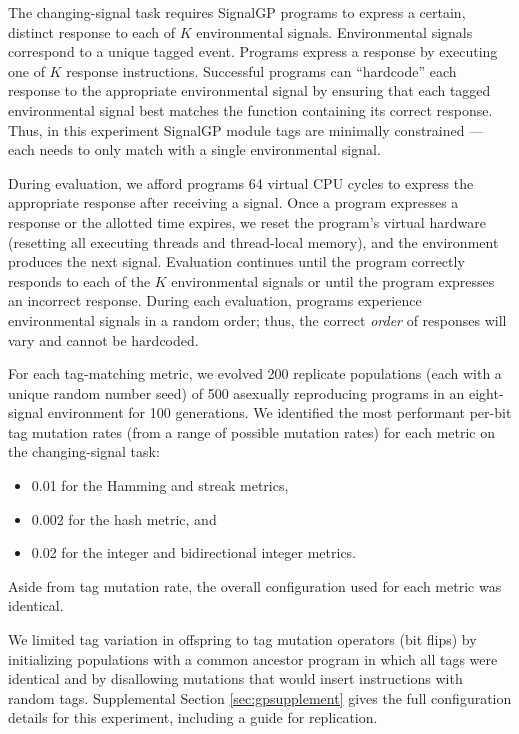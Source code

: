 

The changing-signal task requires SignalGP programs to express a certain, distinct response to each of $K$ environmental signals.
Environmental signals correspond to a unique tagged event.
Programs express a response by executing one of $K$ response instructions.
Successful programs can ``hardcode'' each response to the appropriate environmental signal by ensuring that each tagged environmental signal best matches the function containing its correct response.
Thus, in this experiment SignalGP module tags are minimally constrained --- each needs to only match with a single environmental signal.

During evaluation, we afford programs 64 virtual CPU cycles to express the appropriate response after receiving a signal.
Once a program expresses a response or the allotted time expires, we reset the program's virtual hardware (resetting all executing threads and thread-local memory), and the environment produces the next signal.
Evaluation continues until the program correctly responds to each of the $K$ environmental signals or until the program expresses an incorrect response.
During each evaluation, programs experience environmental signals in a random order; thus, the correct \textit{order} of responses will vary and cannot be hardcoded.

For each tag-matching metric, we evolved 200 replicate populations (each with a unique random number seed) of 500 asexually reproducing programs in an eight-signal environment for 100 generations.
We identified the most performant per-bit tag mutation rates (from a range of possible mutation rates) for each metric on the changing-signal task:
\begin{itemize}
    \item 0.01 for the Hamming and streak metrics,
    \item 0.002 for the hash metric, and
    \item 0.02 for the integer and bidirectional integer metrics.
\end{itemize}
Aside from tag mutation rate, the overall configuration used for each metric was identical.

We limited tag variation in offspring to tag mutation operators (bit flips) by initializing populations with a common ancestor program in which all tags were identical and by disallowing mutations that would insert instructions with random tags.
Supplemental Section \ref{sec:gpsupplement} gives the full configuration details for this experiment, including a guide for replication.

